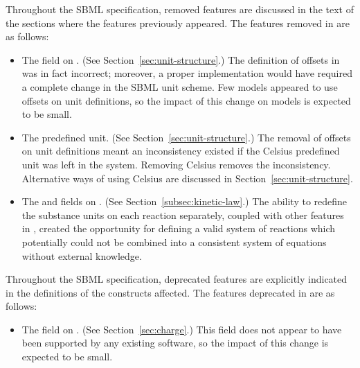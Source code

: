 Throughout the SBML specification, removed features are discussed
in the text of the sections where the features previously appeared.
The features removed in \sbmltwotwo are as follows:
\begin{itemize}
  
\item The  field on \UnitDefinition.  (See
  Section~\ref{sec:unit-structure}.)  The definition of offsets in
  \sbmltwoone was in fact incorrect; moreover, a proper
  implementation would have required a complete change in the SBML
  unit scheme.  Few models appeared to use offsets on unit
  definitions, so the impact of this change on models is expected
  to be small.
  
\item The  predefined unit.  (See
  Section~\ref{sec:unit-structure}.)  The removal of offsets on
  unit definitions meant an inconsistency existed if the Celsius
  predefined unit was left in the system.  Removing Celsius
  removes the inconsistency.  Alternative ways of using Celsius
  are discussed in Section~\ref{sec:unit-structure}.
  
\item The  and  fields on
  \KineticLaw.  (See Section~\ref{subsec:kinetic-law}.)  The
  ability to redefine the substance units on each reaction
  separately, coupled with other features in \sbmltwotwo, created
  the opportunity for defining a valid system of reactions which
  potentially could not be combined into a consistent system of
  equations without external knowledge.

\end{itemize}
Throughout the SBML specification, deprecated features are
explicitly indicated in the definitions of the constructs
affected.  The features deprecated in \sbmltwotwo are as follows:
\begin{itemize}
  
\item The  field on \Species.  (See
  Section~\ref{sec:charge}.)  This field does not appear to have
  been supported by any existing software, so the impact of this
  change is expected to be small.

\end{itemize}

